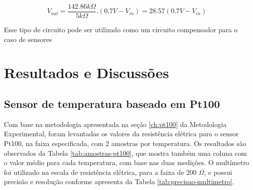 \documentclass[a4paper]{instrumentacao}
\begin{document}
\begin{equation}
	V_{out}=\frac{142.86k\Omega}{5k\Omega}.(0.7V-V_{in})=28.57(0.7V-V_{in})
	\label{eq:ckt-compensador-saida}
\end{equation}

Esse tipo de circuito pode ser utilizado como um circuito compensador para o caso de sensores 


\chapter{Resultados e Discussões}
\section{Sensor de temperatura baseado em Pt100}
Com base na metodologia apresentada na seção \ref{ch:pt100} da Metodologia Experimental, foram levantadas os valores da resistência elétrica para o sensor Pt100, na faixa especificada, com 2 amostras por temperatura. Os resultados são observados da Tabela \ref{tab:amostras-pt100}, que mostra também uma coluna com o valor médio para cada temperatura, com base nas duas medições. O multímetro foi utilizado na escala de resistência elétrica, para a faixa de 200 $\Omega$, e possui precisão e resolução conforme apresenta da Tabela \ref{tab:precisao-multimetro}.
\end{document}
